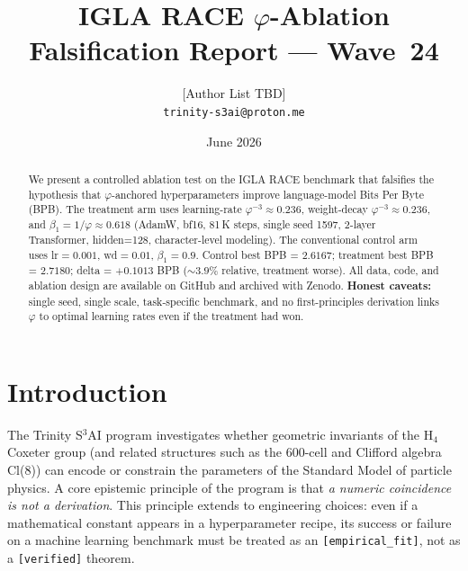 \documentclass[11pt,a4paper]{article}
\begin{document}
\title{IGLA RACE $\varphi$-Ablation Falsification Report — Wave~24}
\author{[Author List TBD]\\
  \texttt{trinity-s3ai@proton.me}}
\date{June 2026}
\maketitle

\begin{abstract}
We present a controlled ablation test on the IGLA RACE benchmark that
falsifies the hypothesis that $\varphi$-anchored hyperparameters improve
language-model Bits Per Byte (BPB).  The treatment arm uses
learning-rate $\varphi^{-3}\approx 0.236$, weight-decay
$\varphi^{-3}\approx 0.236$, and $\beta_{1}=1/\varphi\approx 0.618$
(AdamW, bf16, 81\,K steps, single seed 1597, 2-layer Transformer,
hidden=128, character-level modeling).  The conventional control arm
uses lr$=0.001$, wd$=0.01$, $\beta_{1}=0.9$.  Control best BPB =
$2.6167$; treatment best BPB = $2.7180$; delta = $+0.1013$ BPB
($\sim 3.9\%$ relative, treatment worse).  All data, code, and
ablation design are available on GitHub and archived with Zenodo.
\textbf{Honest caveats:} single seed, single scale, task-specific
benchmark, and no first-principles derivation links $\varphi$ to optimal
learning rates even if the treatment had won.
\end{abstract}

\section{Introduction}

The Trinity S$^3$AI program investigates whether geometric invariants of
the H$_4$ Coxeter group (and related structures such as the 600-cell and
Clifford algebra Cl(8)) can encode or constrain the parameters of the
Standard Model of particle physics.  A core epistemic principle of the
program is that \emph{a numeric coincidence is not a derivation}.  This
principle extends to engineering choices: even if a mathematical constant
appears in a hyperparameter recipe, its success or failure on a machine
learning benchmark must be treated as an \texttt{[empirical\_fit]}, not as
a \texttt{[verified]} theorem.
\end{document}
